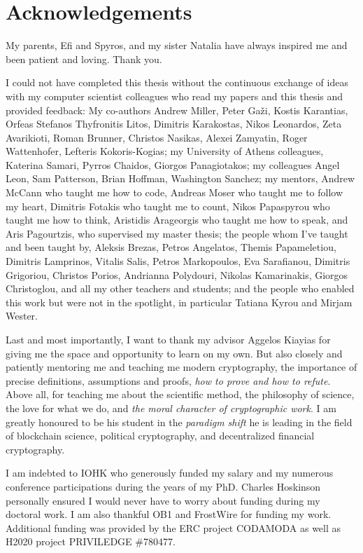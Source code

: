 \section*{Acknowledgements}

My parents, Efi and Spyros, and my sister Natalia have always inspired me and
been patient and loving. Thank you.

I could not have completed this thesis without the continuous exchange of ideas
with my computer scientist colleagues who read my papers and this thesis and
provided feedback: My co-authors Andrew Miller, Peter Ga\v{z}i, Kostis
Karantias, Orfeas Stefanos Thyfronitis Litos, Dimitris Karakostas, Nikos
Leonardos, Zeta Avarikioti, Roman Brunner, Christos Nasikas,  Alexei Zamyatin,
Roger Wattenhofer, Lefteris Kokoris-Kogias; my University of Athens colleagues,
Katerina Samari, Pyrros Chaidos, Giorgos Panagiotakos; my colleagues Angel Leon,
Sam Patterson, Brian Hoffman, Washington Sanchez; my mentors, Andrew McCann who
taught me how to code, Andreas Moser who taught me to follow my heart, Dimitris
Fotakis who taught me to count, Nikos Papaspyrou who taught me how to think,
Aristidis Arageorgis who taught me how to speak, and Aris Pagourtzis, who
supervised my master thesis; the people whom I've taught and been taught by,
Aleksis Brezas, Petros Angelatos, Themis Papameletiou, Dimitris Lamprinos,
Vitalis Salis, Petros Markopoulos, Eva Sarafianou, Dimitris Grigoriou, Christos
Porios, Andrianna Polydouri, Nikolas Kamarinakis, Giorgos Christoglou, and all
my other teachers and students; and the people who enabled this work but were
not in the spotlight, in particular Tatiana Kyrou and Mirjam Wester.

Last and most importantly, I want to thank my advisor Aggelos Kiayias for
giving me the space and opportunity to learn on my own. But also closely and
patiently mentoring me and teaching me modern cryptography, the importance of
precise definitions, assumptions and proofs, \emph{how to prove and how to
refute}. Above all, for teaching me about the scientific method, the philosophy
of science, the love for what we do, and \emph{the moral character of
cryptographic work}. I am greatly honoured to be his student in the
\emph{paradigm shift} he is leading in the field of blockchain science,
political cryptography, and decentralized financial cryptography.

I am indebted to IOHK who generously funded my salary and my numerous conference
participations during the years of my PhD. Charles Hoskinson personally ensured
I would never have to worry about funding during my doctoral work. I am also
thankful OB1 and FrostWire for funding my work. Additional funding was provided
by the ERC project CODAMODA as well as H2020 project PRIVILEDGE \#780477.

